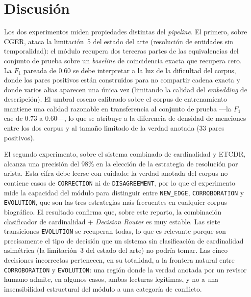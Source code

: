 \section{Discusión}\label{sec:eval-discussion}

Los dos experimentos miden propiedades distintas del \emph{pipeline}. El primero, sobre CGER, ataca la limitación~5 del estado del arte (resolución de entidades sin temporalidad): el módulo recupera dos terceras partes de las equivalencias del conjunto de prueba sobre un \emph{baseline} de coincidencia exacta que recupera cero. La $F_1$ pareada de $0.60$ se debe interpretar a la luz de la dificultad del corpus, donde los pares positivos están construidos para no compartir cadena exacta y donde varios alias aparecen una única vez (limitando la calidad del \emph{embedding} de descripción). El umbral coseno calibrado sobre el corpus de entrenamiento mantiene una calidad razonable en transferencia al conjunto de prueba ---la $F_1$ cae de $0.73$ a $0.60$---, lo que se atribuye a la diferencia de densidad de menciones entre los dos corpus y al tamaño limitado de la verdad anotada (33 pares positivos).

El segundo experimento, sobre el sistema combinado de cardinalidad y ETCDR, alcanza una precisión del 98\% en la elección de la estrategia de resolución por arista. Esta cifra debe leerse con cuidado: la verdad anotada del corpus no contiene casos de \texttt{CORRECTION} ni de \texttt{DISAGREEMENT}, por lo que el experimento mide la capacidad del módulo para distinguir entre \texttt{NEW\_EDGE}, \texttt{CORROBORATION} y \texttt{EVOLUTION}, que son las tres estrategias más frecuentes en cualquier corpus biográfico. El resultado confirma que, sobre este reparto, la combinación clasificador de cardinalidad + \emph{Decision Router} es muy estable. Las siete transiciones \texttt{EVOLUTION} se recuperan todas, lo que es relevante porque son precisamente el tipo de decisión que un sistema sin clasificación de cardinalidad asimétrica (la limitación~3 del estado del arte) no podría tomar. Las cinco decisiones incorrectas pertenecen, en su totalidad, a la frontera natural entre \texttt{CORROBORATION} y \texttt{EVOLUTION}: una región donde la verdad anotada por un revisor humano admite, en algunos casos, ambas lecturas legítimas, y no a una insensibilidad estructural del módulo a una categoría de conflicto.

